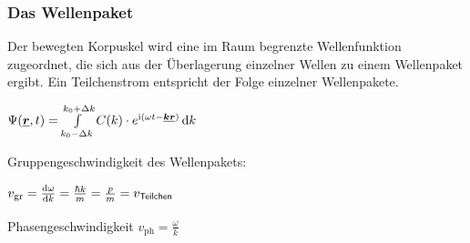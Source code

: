 \documentclass[fs, footer]{latex4ei}
\begin{document}
\begin{multicols*}{4}
{\subsubsection{Das Wellenpaket}
Der bewegten Korpuskel wird eine im Raum begrenzte Wellenfunktion zugeordnet, die sich aus der Überlagerung einzelner Wellen zu einem Wellenpaket ergibt. Ein Teilchenstrom entspricht der Folge einzelner Wellenpakete.

$\Psi(\vec{r},t) = \int\limits_{k_0 - \Delta k}^{k_0 + \Delta k}{C(k) \cdot e^{\i (\omega t - \vec{k} \vec{r})} \diff k}$

Gruppengeschwindigkeit des Wellenpakets:

$v_{\text{gr}} = \frac{\diff \omega}{\diff k} = \frac{\hbar k}{m} = \frac{p}{m} = v_{\ir Teilchen}$

Phasengeschwindigkeit $v_{\text{ph}} = \frac{\omega}{k}$
} 


\end{multicols*}
\end{document}
